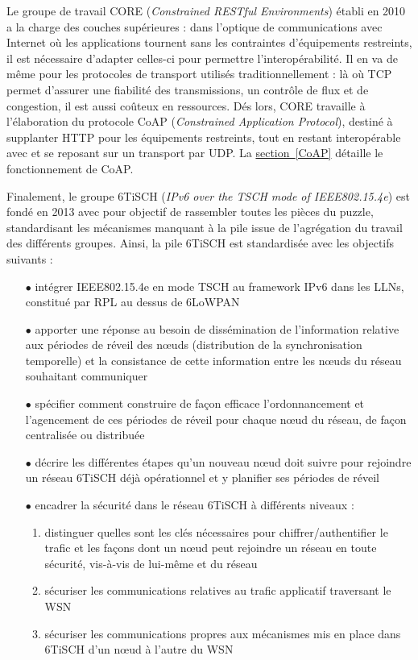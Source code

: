 \documentclass[]{report}
\newcommand{\wordlink}[2]{\hyperref[#2]{#1~\ref{#2}}}
\begin{document}
Le groupe de travail CORE (\textit{Constrained RESTful Environments}) établi en 2010 a la charge des couches supérieures : dans l'optique de communications avec Internet où les applications tournent sans les contraintes d'équipements restreints, il est nécessaire d'adapter celles-ci pour permettre l'interopérabilité. Il en va de même pour les protocoles de transport utilisés traditionnellement : là où TCP permet d'assurer une fiabilité des transmissions, un contrôle de flux et de congestion, il est aussi coûteux en ressources. Dés lors, CORE travaille à l'élaboration du protocole CoAP (\textit{Constrained Application Protocol}), destiné à supplanter HTTP pour les équipements restreints, tout en restant interopérable avec et se reposant sur un transport par UDP. La \wordlink{section}{CoAP} détaille le fonctionnement de CoAP.\\

\par Finalement, le groupe 6TiSCH (\textit{IPv6 over the TSCH mode of IEEE802.15.4e}) est fondé en 2013 avec pour objectif de rassembler toutes les pièces du puzzle, standardisant les mécanismes manquant à la pile issue de l'agrégation du travail des différents groupes. Ainsi, la pile 6TiSCH est standardisée avec les objectifs suivants :\\
\begin{itemize}
\item[$\bullet$] intégrer IEEE802.15.4e en mode TSCH au framework IPv6 dans les LLNs, constitué par RPL au dessus de 6LoWPAN
\vspace{0.1cm}
\item[$\bullet$] apporter une réponse au besoin de dissémination de l'information relative aux périodes de réveil des nœuds (distribution de la synchronisation temporelle) et la consistance de cette information entre les nœuds du réseau souhaitant communiquer
\vspace{0.1cm}
\item[$\bullet$] spécifier comment construire de façon efficace l'ordonnancement et l'agencement de ces périodes de réveil pour chaque nœud du réseau, de façon centralisée ou distribuée
\vspace{0.1cm}
\item[$\bullet$] décrire les différentes étapes qu'un nouveau nœud doit suivre pour rejoindre un réseau 6TiSCH déjà opérationnel et y planifier ses périodes de réveil
\vspace{0.1cm}
\item[$\bullet$] encadrer la sécurité dans le réseau 6TiSCH à différents niveaux :
	\begin{enumerate}
	\item distinguer quelles sont les clés nécessaires pour chiffrer/authentifier le trafic et les façons dont un nœud peut rejoindre un réseau en toute sécurité, vis-à-vis de lui-même et du réseau
	\item sécuriser les communications relatives au trafic applicatif traversant le WSN
	\item sécuriser les communications propres aux mécanismes mis en place dans 6TiSCH d'un nœud à l'autre du WSN
	\end{enumerate}
\end{itemize} 
\end{document}
